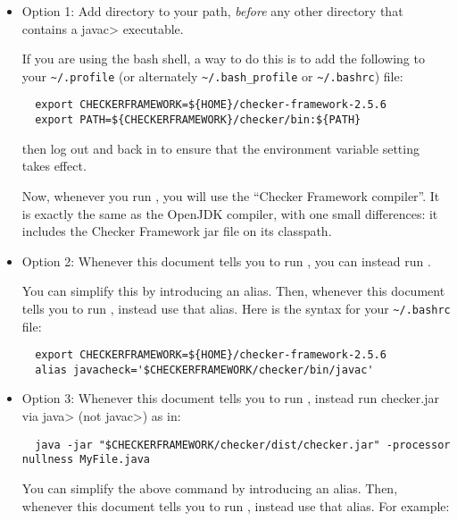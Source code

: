 \begin{itemize}
  \item
    Option 1:
    Add directory
     to your path, \emph{before} any other
    directory that contains a \<javac> executable.

    If you are
    using the bash shell, a way to do this is to add the following to your
    \verb|~/.profile| (or alternately \verb|~/.bash_profile| or \verb|~/.bashrc|) file:
\begin{Verbatim}
  export CHECKERFRAMEWORK=${HOME}/checker-framework-2.5.6
  export PATH=${CHECKERFRAMEWORK}/checker/bin:${PATH}
\end{Verbatim}
    then log out and back in to ensure that the environment variable
    setting takes effect.

    Now, whenever you run , you will use the ``Checker
    Framework compiler''.  It is exactly the same as the OpenJDK compiler,
    with one small differences:  it includes the Checker Framework jar file
    on its classpath.

  \item
    \begin{sloppypar}
    Option 2:
    Whenever this document tells you to run , you
    can instead run .
    \end{sloppypar}

    You can simplify this by introducing an alias.  Then,
    whenever this document tells you to run , instead use that
    alias.  Here is the syntax for your
    \verb|~/.bashrc| file:
\begin{Verbatim}
  export CHECKERFRAMEWORK=${HOME}/checker-framework-2.5.6
  alias javacheck='$CHECKERFRAMEWORK/checker/bin/javac'
\end{Verbatim}

   \item
   Option 3:
   Whenever this document tells you to run , instead
   run checker.jar via \<java> (not \<javac>) as in:

\begin{Verbatim}
  java -jar "$CHECKERFRAMEWORK/checker/dist/checker.jar" -processor nullness MyFile.java
\end{Verbatim}

    You can simplify the above command by introducing an alias.  Then,
    whenever this document tells you to run , instead use that
    alias.  For example:


\end{itemize}
